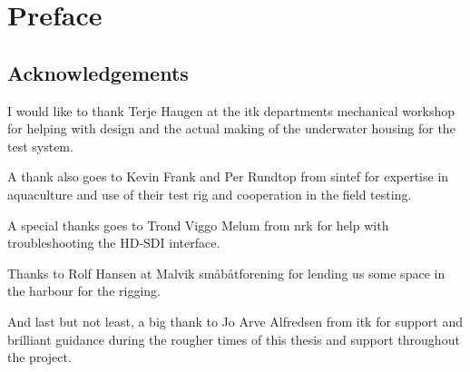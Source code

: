 
\chapter{Preface}

\section{Acknowledgements}

I would like to thank Terje Haugen at the \gls{itk} departments mechanical workshop for 
helping with design and the actual making of the underwater housing for the test system.

A thank also goes to Kevin Frank and Per Rundtop from \gls{sintef} for expertise 
in aquaculture and use of their test rig and cooperation in the field testing. 

A special thanks goes to Trond Viggo Melum from \gls{nrk} for help with troubleshooting the HD-SDI interface.

Thanks to Rolf Hansen at Malvik småbåtforening for lending us some space in the harbour for the rigging.

And last but not least, a big thank to Jo Arve Alfredsen from \gls{itk} for support and 
brilliant guidance during the rougher times of this thesis and support throughout the project.